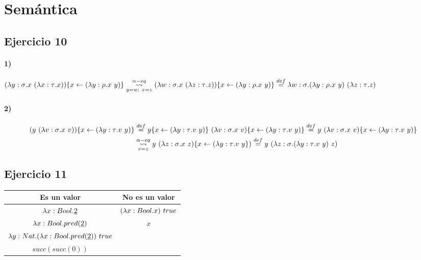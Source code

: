 \documentclass[10pt,a4paper, landscape]{article}
\begin{document}
\newpage
\section*{\centering Semántica}
\subsection{Ejercicio 10}
\paragraph{1)} $(\lambda y: \sigma \text{.} x~(\lambda x: \tau \text{.} x))\{x\leftarrow(\lambda y: \rho \text{.} x~y)\}
\underset{y=w;~x=z}{\overset{\alpha-eq}{\leadsto}}(\lambda w: \sigma \text{.} x~(\lambda z: \tau \text{.} z))\{x\leftarrow(\lambda y: \rho \text{.} x~y)\} 
\overset{def}{=} \lambda w: \sigma \text{.} (\lambda y: \rho \text{.} x~y)~(\lambda z: \tau \text{.} z)$

\paragraph{2)}
\begin{equation*}
\begin{split}
(y~(\lambda v: \sigma \text{.} x~v))\{x\leftarrow(\lambda y: \tau \text{.} v~y)\} 
&\overset{def}{=} y\{x\leftarrow(\lambda y: \tau \text{.} v~y)\}~(\lambda v: \sigma \text{.} x~v)\{x\leftarrow(\lambda y: \tau \text{.} v~y)\}
\overset{def}{=}
y~(\lambda v: \sigma \text{.} x~v)\{x\leftarrow(\lambda y: \tau \text{.} v~y)\} \\
&\underset{v=z}{\overset{\alpha-eq}{\leadsto}}
y~(\lambda z: \sigma \text{.} x~z)\{x\leftarrow(\lambda y: \tau \text{.} v~y\}) 
\overset{def}{=} y~(\lambda z: \sigma \text{.} (\lambda y: \tau \text{.} v~y)~z)
\end{split}
\end{equation*}

\subsection{Ejercicio 11}
\begin{center}
\begin{tabular}{c|c}
\textbf{Es un valor} & \textbf{No es un valor} \\
\hline
$\lambda x:  Bool \text{.} \underline{2}$ & $(\lambda x:  Bool \text{.} x)~true$ \\
$\lambda x:  Bool \text{.} pred(\underline{2})$ &  $x$ \\
$\lambda y:  Nat \text{.} (\lambda x:  Bool \text{.} pred(\underline{2}))~true$ &  \\
$succ(succ(0))$ &  \\
\end{tabular}
\end{center}
\end{document}
